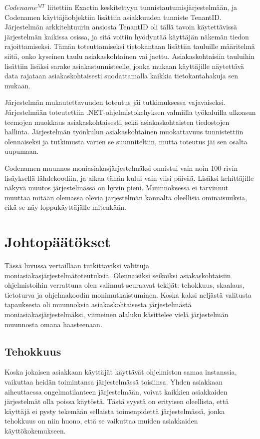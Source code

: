 $Codename^{MT}$ liitettiin Exactin keskitettyyn tunnistautumisjärjestelmään, ja Codenamen käyttäjäobjektiin lisättiin asiakkuuden tunniste TenantID. Järjestelmän arkkitehtuurin ansiosta TenantID oli tällä tavoin käytettävissä järjestelmän kaikissa osissa, ja sitä voitiin hyödyntää käyttäjän näkemän tiedon rajoittamiseksi. Tämän toteuttamiseksi tietokantaan lisättiin tauluille määritelmä siitä, onko kyseinen taulu asiakaskohtainen vai jaettu. Asiakaskohtaisiin tauluihin lisättiin lisäksi sarake asiakastunnisteelle, jonka mukaan käyttäjille näytettävä data rajataan asiakaskohtaisesti suodattamalla kaikkia tietokantahakuja sen mukaan.

Järjestelmän mukautettavuuden toteutus jäi tutkimuksessa vajavaiseksi. Järjestelmään toteutettiin .NET-ohjelmistokehyksen valmiilla työkaluilla ulkoasun teemojen muokkaus asiakaskohtaisesti, sekä asiakaskohtaisten tiedostojen hallinta. Järjestelmän työnkulun asiakaskohtainen muokattavuus tunnistettiin olennaiseksi ja tutkimusta varten se suunniteltiin, mutta toteutus jäi sen osalta uupumaan.

Codenamen muunnos moniasiakasjärjestelmäksi onnistui vain noin 100 rivin lisäyksellä lähdekoodiin, ja aikaa tähän kului vain viisi päivää. Lisäksi kehittäjille näkyvä muutos järjestelmässä on hyvin pieni. Muunnoksessa ei tarvinnut muuttaa mitään olemassa olevia järjestelmän kannalta oleellisia ominaisuuksia, eikä se näy loppukäyttäjälle mitenkään.

\chapter{Johtopäätökset}

Tässä luvussa vertaillaan tutkittaviksi valittuja moniasiakasjärjestelmätoteutuksia. Olennaisiksi seikoiksi asiakaskohtaisiin ohjelmistoihin verrattuna olen valinnut seuraavat tekijät: tehokkuus, skaalaus, tietoturva ja ohjelmakoodin monimutkaistuminen. Koska kaksi neljästä valitusta tapauksesta oli muunnoksia asiakaskohtaisesta järjestelmästä moniasiakasjärjestelmäksi, viimeinen alaluku käsittelee vielä järjestelmän muunnosta omana haasteenaan.

\section{Tehokkuus}
Koska jokaisen asiakkaan käyttäjät käyttävät ohjelmiston samaa instanssia, vaikuttaa heidän toimintansa järjestelmässä toisiinsa. Yhden asiakkaan aiheuttaessa ongelmatilanteen järjestelmään, voivat kaikkien asiakkaiden järjestelmät olla poissa käytöstä. Tästä syystä on erityisen oleellista, että käyttäjä ei pysty tekemään sellaista toimenpidettä järjestelmässä, jonka tehokkuus on niin huono, että se vaikuttaa muiden asiakkaiden käyttökokemukseen.

